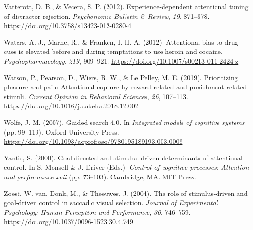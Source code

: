 \documentclass[man, a4paper, noextraspace, 11pt,floatsintext]{apa6}
\begin{document}
\hypertarget{ref-Vatterott2012}{}
Vatterott, D. B., \& Vecera, S. P. (2012). Experience-dependent
attentional tuning of distractor rejection. \emph{Psychonomic Bulletin
\& Review}, \emph{19}, 871--878.
\url{https://doi.org/10.3758/s13423-012-0280-4}

\hypertarget{ref-Waters2012}{}
Waters, A. J., Marhe, R., \& Franken, I. H. A. (2012). Attentional bias
to drug cues is elevated before and during temptations to use heroin and
cocaine. \emph{Psychopharmacology}, \emph{219}, 909--921.
\url{https://doi.org/10.1007/s00213-011-2424-z}

\hypertarget{ref-Watson2019}{}
Watson, P., Pearson, D., Wiers, R. W., \& Le Pelley, M. E. (2019).
Prioritizing pleasure and pain: Attentional capture by reward-related
and punishment-related stimuli. \emph{Current Opinion in Behavioral
Sciences}, \emph{26}, 107--113.
\url{https://doi.org/10.1016/j.cobeha.2018.12.002}

\hypertarget{ref-Wolfe2007}{}
Wolfe, J. M. (2007). Guided search 4.0. In \emph{Integrated models of
cognitive systems} (pp. 99--119). Oxford University Press.
\url{https://doi.org/10.1093/acprof:oso/9780195189193.003.0008}

\hypertarget{ref-Yantis2000}{}
Yantis, S. (2000). Goal-directed and stimulus-driven determinants of
attentional control. In S. Monsell \& J. Driver (Eds.), \emph{Control of
cognitive processes: Attention and performance xvii} (pp. 73--103).
Cambridge, MA: MIT Press.

\hypertarget{ref-VanZoest2004}{}
Zoest, W. van, Donk, M., \& Theeuwes, J. (2004). The role of
stimulus-driven and goal-driven control in saccadic visual selection.
\emph{Journal of Experimental Psychology: Human Perception and
Performance}, \emph{30}, 746--759.
\url{https://doi.org/10.1037/0096-1523.30.4.749}

\endgroup
\end{document}

